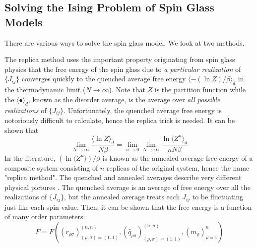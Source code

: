 \documentclass[%
 reprint,
 amsmath,amssymb,
 aps,
]{revtex4-2}
\begin{document}
\subsection{Solving the Ising Problem of Spin Glass Models}

There are various ways to solve the spin glass model. We look at two methods.


The replica method uses the important property \cite{huang2021statistical_self_avg} originating from spin glass physics that the free energy of the spin glass due to \textit{a particular realization} of $\{J_{ij}\}$ converges quickly to the quenched average free energy $\langle - (\ln{Z})/\beta \rangle_d$ in the thermodynamic limit ($N \rightarrow \infty$). Note that $Z$ is the partition function while the $\langle \bullet \rangle_d$, known as the disorder average, is the average over \textit{all possible realizations} of $\{J_{ij}\}$. Unfortunately, the quenched average free energy is notoriously difficult to calculate, hence the replica trick is needed. It can be shown \cite{huang2021statistical_replica_trick} that 
\begin{equation}
    \lim_{N\rightarrow \infty} \frac{\langle \ln{Z} \rangle_d}{N\beta}  = \lim_{n\rightarrow 0} \lim_{N\rightarrow \infty} \frac{\ln{\langle Z^n \rangle_d}}{nN\beta} \label{eq:replica_trick}
\end{equation}
In the literature, $(\ln{\langle Z^n \rangle})/\beta$ is known as the annealed average free energy of a composite system consisting of $n$ replicas of the original system, hence the name "replica method". The quenched and annealed averages describe very different physical pictures \cite{Castellani_2005}. The quenched average is an average of free energy over all the realizations of $\{J_{ij}\}$, but the annealed average treats each $J_{ij}$ to be fluctuating just like each spin value. Then, it can be shown \cite{huang2021statistical_replica_F} that the free energy is a function of many order parameters:
\begin{equation}
    F=F\left( (r_{\rho \sigma})_{(\rho,\sigma)=(1,1)}^{(n,n)}, (\hat{q}_{\rho \sigma})_{(\rho,\sigma)=(1,1)}^{(n,n)}, (m_\rho)_{\rho=1}^{n} \right) \label{eq:replica_F}
\end{equation}
\end{document}
